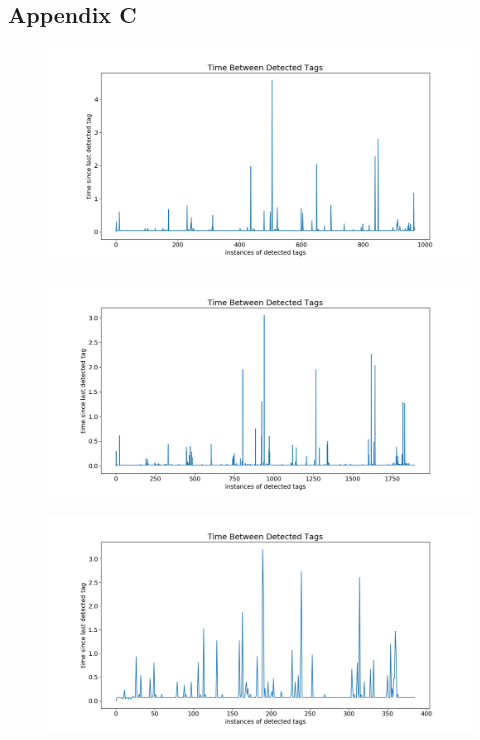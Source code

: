 \documentclass{article}
\begin{document}
  \subsection{Appendix C}\label{appendix:tag_detection}
    \begin{figure}[H]
      \centering
      \includegraphics[width=1\linewidth]{./images/detection_times_480p30.png}
    \end{figure}
    \begin{figure}[H]
      \centering
      \includegraphics[width=1\linewidth]{./images/detection_times_480p60.png}
    \end{figure}
    \begin{figure}[H]
      \centering
      \includegraphics[width=1\linewidth]{./images/detection_times_1080p15.png}
    \end{figure}





\end{document}
